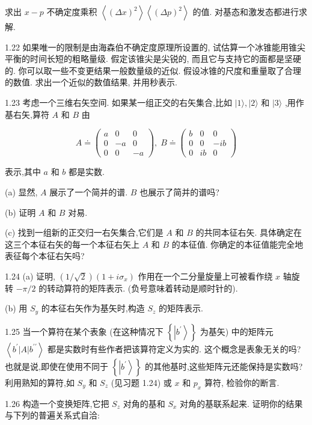 \documentclass[lang=cn,newtx,10pt,scheme=chinese,thmcnt=section]{elegantbook}
\begin{document}
求出 $x - p$ 不确定度乘积 $\left\langle {\left( \Delta x\right) }^{2}\right\rangle \left\langle {\left( \Delta p\right) }^{2}\right\rangle$ 的值. 对基态和激发态都进行求解.

1.22 如果唯一的限制是由海森伯不确定度原理所设置的, 试估算一个冰锥能用锥尖平衡的时间长短的粗略量级. 假定该锥尖是尖锐的, 而且它与支持它的面都是坚硬的. 你可以取一些不变更结果一般数量级的近似. 假设冰锥的尺度和重量取了合理的数值. 求出一个近似的数值结果, 并用秒表示.

1.23 考虑一个三维右矢空间. 如果某一组正交的右矢集合,比如 $\left| {1\rangle ,}\right| 2\rangle$ 和 $|3\rangle$ ,用作基右矢,算符 $A$ 和 $B$ 由

$$
A \doteq \left( \begin{matrix} a & 0 & 0 \\ 0 & - a & 0 \\ 0 & 0 & - a \end{matrix}\right) ,\;B \doteq \left( \begin{matrix} b & 0 & 0 \\ 0 & 0 & - {ib} \\ 0 & {ib} & 0 \end{matrix}\right)
$$

表示,其中 $a$ 和 $b$ 都是实数.

(a) 显然, $A$ 展示了一个简并的谱. $B$ 也展示了简并的谱吗?

(b) 证明 $A$ 和 $B$ 对易.

(c) 找到一组新的正交归一右矢集合,它们是 $A$ 和 $B$ 的共同本征右矢. 具体确定在这三个本征右矢的每一个本征右矢上 $A$ 和 $B$ 的本征值. 你确定的本征值能完全地表征每个本征右矢吗?

1.24 (a) 证明, $\left( {1/\sqrt{2}}\right) \left( {1 + i{\sigma }_{x}}\right)$ 作用在一个二分量旋量上可被看作绕 $x$ 轴旋转 $- \pi /2$ 的转动算符的矩阵表示. (负号意味着转动是顺时针的).

(b) 用 ${S}_{y}$ 的本征右矢作为基矢时,构造 ${S}_{z}$ 的矩阵表示.

1.25 当一个算符在某个表象 (在这种情况下 $\left\{ \left| {b}^{\prime }\right\rangle \right\}$ 为基矢) 中的矩阵元 $\left\langle {{b}^{\prime }\left| A\right| {b}^{\prime \prime }}\right\rangle$ 都是实数时有些作者把该算符定义为实的. 这个概念是表象无关的吗? 也就是说,即使在使用不同于 $\left\{ \left| {b}^{\prime }\right\rangle \right\}$ 的其他基时,这些矩阵元还能保持是实数吗? 利用熟知的算符,如 ${S}_{y}$ 和 ${S}_{z}$ (见习题 1.24) 或 $x$ 和 ${p}_{x}$ 算符, 检验你的断言.

1.26 构造一个变换矩阵,它把 ${S}_{z}$ 对角的基和 ${S}_{x}$ 对角的基联系起来. 证明你的结果与下列的普遍关系式自洽:
\end{document}
